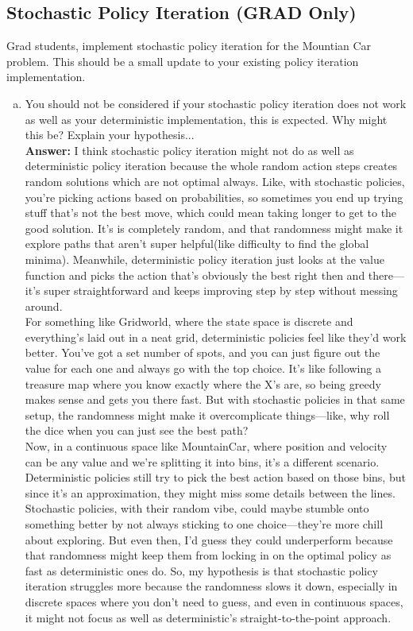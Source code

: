 \documentclass{article}
\newenvironment{answer}{{\bf Answer:} \sf }{}%
\begin{document}
\newpage

\subsection{Stochastic Policy Iteration (GRAD Only)}

Grad students, implement stochastic policy iteration for the Mountian Car problem. This should
be a small update to your existing policy iteration implementation.

\begin{enumerate}[a)]
    \item You should not be considered if your stochastic policy iteration does not work as well as your
    deterministic implementation, this is expected. Why might this be? Explain your hypothesis...
    \\\begin{answer}
      I think stochastic policy iteration might not do as well as deterministic policy iteration because the whole random action steps creates random solutions which are not optimal always. Like, with stochastic policies, you’re picking actions based on probabilities, so sometimes you end up trying stuff that’s not the best move, which could mean taking longer to get to the good solution. It’s is completely random, and that randomness might make it explore paths that aren’t super helpful(like difficulty to find the global minima). Meanwhile, deterministic policy iteration just looks at the value function and picks the action that’s obviously the best right then and there—it’s super straightforward and keeps improving step by step without messing around.
      \\
      For something like Gridworld, where the state space is discrete and everything’s laid out in a neat grid, deterministic policies feel like they’d work better. You’ve got a set number of spots, and you can just figure out the value for each one and always go with the top choice. It’s like following a treasure map where you know exactly where the X’s are, so being greedy makes sense and gets you there fast. But with stochastic policies in that same setup, the randomness might make it overcomplicate things—like, why roll the dice when you can just see the best path?
      \\
      Now, in a continuous space like MountainCar, where position and velocity can be any value and we’re splitting it into bins, it’s a different scenario. Deterministic policies still try to pick the best action based on those bins, but since it’s an approximation, they might miss some details between the lines. Stochastic policies, with their random vibe, could maybe stumble onto something better by not always sticking to one choice—they’re more chill about exploring. But even then, I’d guess they could underperform because that randomness might keep them from locking in on the optimal policy as fast as deterministic ones do. So, my hypothesis is that stochastic policy iteration struggles more because the randomness slows it down, especially in discrete spaces where you don’t need to guess, and even in continuous spaces, it might not focus as well as deterministic’s straight-to-the-point approach.    \end{answer}

\end{enumerate}
\end{document}
